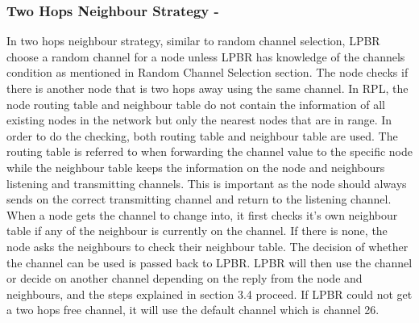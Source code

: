 \subsubsection{Two Hops Neighbour Strategy -}
In two hops neighbour strategy, similar to random channel selection, LPBR choose a random channel for a node unless LPBR has knowledge of the channels condition as mentioned in Random Channel Selection section. The node checks if there is another node that is two hops away using the same channel. In RPL, the node routing table and neighbour table do not contain the information of all existing nodes in the network but only the nearest nodes that are in range. In order to do the checking, both routing table and neighbour table are used. The routing table is referred to when forwarding the channel value to the specific node while the neighbour table keeps the information on the node and neighbours listening and transmitting channels. This is important as the node should always sends on the correct transmitting channel and return to the listening channel. When a node gets the channel to change into, it first checks it's own neighbour table if any of the neighbour is currently on the channel. If there is none, the node asks the neighbours to check their neighbour table. The decision of whether the channel can be used is passed back to LPBR. LPBR will then use the channel or decide on another channel depending on the reply from the node and neighbours, and the steps explained in section 3.4 proceed. If LPBR could not get a two hops free channel, it will use the default channel which is channel 26.
